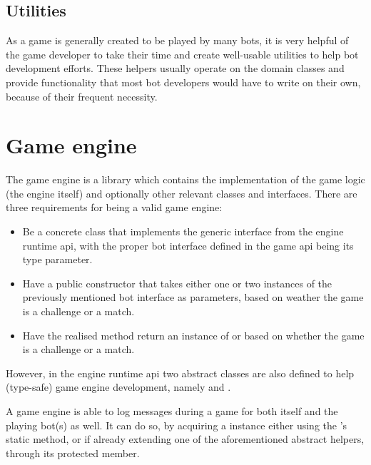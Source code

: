 		\subsection*{Utilities}
		
		As a game is generally created to be played by many bots, it is very helpful of the game developer to take their time and create well-usable utilities to help bot development efforts. These helpers usually operate on the domain classes and provide functionality that most bot developers would have to write on their own, because of their frequent necessity.

	\section{Game engine}
	
	The game engine is a library which contains the implementation of the game logic (the engine itself) and optionally other relevant classes and interfaces. There are three requirements for being a valid game engine:
	
	\begin{itemize}
		\item Be a concrete class that implements the generic  interface from the engine runtime api, with the proper bot interface defined in the game api being its type parameter.
		
		\item Have a public constructor that takes either one or two instances of the previously mentioned bot 
		interface as parameters, based on weather the game is a challenge or a match.
		
		\item Have the realised  method return an instance of  or  based on whether the game is a challenge or a match.
	\end{itemize} 
	
	However, in the engine runtime api two abstract classes are also defined to help (type-safe) game engine development, namely  and .
	
	A game engine is able to log messages during a game for both itself and the playing bot(s) as well. It can do so, by acquiring a  instance either using the 's static  method, or if already extending one of the aforementioned abstract helpers, through its  protected member.  
	
